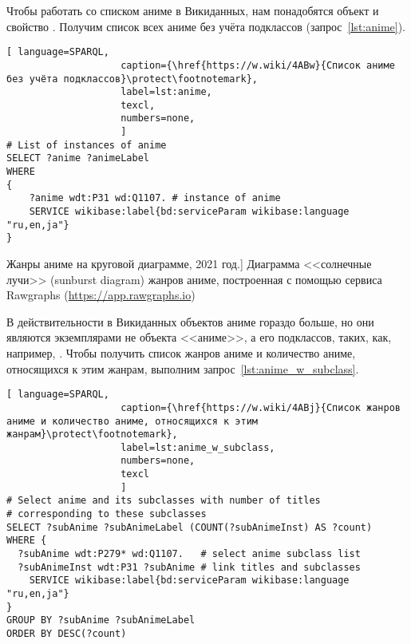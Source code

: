 Чтобы работать со списком аниме в Викиданных, 
нам понадобятся объект  и свойство . 
Получим список всех аниме без учёта подклассов (запрос~\ref{lst:anime}).

\newpage

\begin{lstlisting}[ language=SPARQL, 
                    caption={\href{https://w.wiki/4ABw}{Список аниме без учёта подклассов}\protect\footnotemark},
                    label=lst:anime,
                    texcl,
                    numbers=none,
                    ]
# List of instances of anime
SELECT ?anime ?animeLabel
WHERE
{
    ?anime wdt:P31 wd:Q1107. # instance of anime
    SERVICE wikibase:label{bd:serviceParam wikibase:language "ru,en,ja"}
}
\end{lstlisting}%

\begin{marginfigure}[1\baselineskip]
{
	\setlength{\fboxsep}{0pt}%
	\setlength{\fboxrule}{1pt}%
}
\caption%
[Жанры аниме на круговой диаграмме, 2021 год.]%
{%
Диаграмма <<солнечные лучи>> (sunburst diagram) жанров аниме, построенная с помощью сервиса Rawgraphs (\href{https://app.rawgraphs.io}{https://app.rawgraphs.io})}%
\label{fig:anime_piechart}
\end{marginfigure}

В действительности в Викиданных объектов аниме гораздо больше, 
но они являются экземплярами не объекта <<аниме>>, а его подклассов, 
таких, как, например, . 
Чтобы получить список жанров аниме и количество аниме, 
относящихся к этим жанрам, выполним запрос~\ref{lst:anime_w_subclass}.

\begin{lstlisting}[ language=SPARQL, 
                    caption={\href{https://w.wiki/4ABj}{Список жанров аниме и количество аниме, относящихся к этим жанрам}\protect\footnotemark},
                    label=lst:anime_w_subclass,
                    numbers=none,
                    texcl 
                    ]
# Select anime and its subclasses with number of titles
# corresponding to these subclasses
SELECT ?subAnime ?subAnimeLabel (COUNT(?subAnimeInst) AS ?count)
WHERE {
  ?subAnime wdt:P279* wd:Q1107.   # select anime subclass list
  ?subAnimeInst wdt:P31 ?subAnime # link titles and subclasses
    SERVICE wikibase:label{bd:serviceParam wikibase:language "ru,en,ja"}
}
GROUP BY ?subAnime ?subAnimeLabel
ORDER BY DESC(?count)
\end{lstlisting}%


